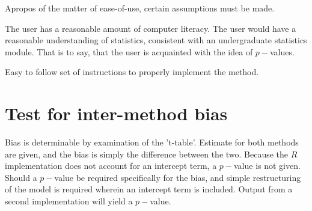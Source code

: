 \documentclass[12pt, a4paper]{report}
\theoremstyle{plain}
\theoremstyle{definition}
\theoremstyle{remark}
\begin{document}









\newpage

Apropos of the matter of ease-of-use, certain assumptions must be made.
	
The user has a reasonable amount of computer literacy. The user would have a reasonable understanding of statistics, consistent with an undergraduate statistics module. That is to say, that the user is acquainted with the idea of $p-$values.
	
Easy to follow set of instructions to properly implement the method.

\section{Test for inter-method bias}
Bias is determinable by examination of the 't-table'. Estimate for both methods are given, and the bias is simply the difference between the two. Because the $R$ implementation does not account for an intercept term, a $p-$value is not given. Should a $p-$value be required specifically for the bias, and simple restructuring of the model is required wherein an intercept term is included. Output from a second implementation will yield a $p-$value.
\end{document}
